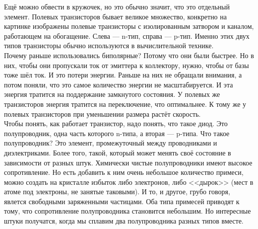 \documentclass{article}
\begin{document}
    \begin{center}
    \end{center}
    Ещё можно обвести в кружочек, но это обычно значит, что это отдельный элемент. Полевых транзисторов бывает великое множество, конкретно на картинке изображены полевые транзисторы с изолированным затвором и каналом, работающем на обогащение. Слева --- n-тип, справа --- p-тип. Именно этих двух типов транзисторы обычно используются в вычислительной технике.\\
    Почему раньше использовались биполярные? Потому что они были быстрее. Но в них, чтобы они пропускали ток от эмиттера к коллектору, нужно, чтобы от базы тоже шёл ток. И это потери энергии. Раньше на них не обращали внимания, а потом поняли, что это самое количество энергии не масштабируется. И эта энергия тратится на поддержание замкнутого состояния. У полевых же транзисторов энергия тратится на переключение, что оптимальнее. К тому же у полевых транзисторов при уменьшении размера растёт скорость.\\
    Чтобы понять, как работает транзистор, надо понять, что такое диод. Это полупроводник, одна часть которого n-типа, а вторая --- p-типа. Что такое полупроводник? Это элемент, промежуточный между проводниками и диэлектриками. Более того, такой, который может менять своё состояние в зависимости от разных штук. Химически чистые полупроводники имеют высокое сопротивление. Но есть добавить к ним очень небольшое количество примеси, можно создать на кристалле избыток либо электронов, либо <<дырок>> (мест в атоме под электроны, не занятые таковыми). И то, и другое, грубо говоря, явлется свободными заряженными частицами. Оба типа примесей приводят к тому, что сопротивление полупроводника становится небольшим. Но интересные штуки получатся, когда мы сплавим два полупроводника разных типов вместе.
    \begin{center}
        \hspace{5cm}
    \end{center}
\end{document}
